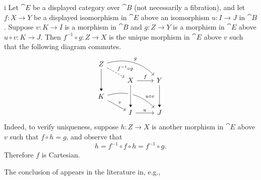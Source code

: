 \begin{partsolution}{i}
Let \(\cat{E}\) be a displayed category over \(\cat{B}\) (not necessarily a fibration), and let \(f : X \to Y\) be a displayed isomorphism in \(\cat{E}\) above an isomorphism \(u : I \to J\) in \(\cat{B}\).
Suppose \(v : K \to I\) is a morphism in \(\cat{B}\) and \(g : Z \to Y\) is a morphism in \(\cat{E}\) above \(u \circ v : K \to J\). Then \(f^{-1} \circ g : Z \to X\) is the unique morphism in \(\cat{E}\) above \(v\) such that the following diagram commutes.
\begin{equation*}
\begin{tikzcd}[row sep=small]
Z \arrow[rd, dashed, "f^{-1} \circ g"] \arrow[rrd, bend left, "g"] \arrow[dd, -Triangle] \\
& X \arrow[r, "f"] & Y \arrow[dd, -Triangle] \\
K \arrow[rd, "v"] \arrow[rrd, bend left, near end, "u \circ v"] \\
& I \arrow[r, "u"] & J
\arrow[from=uul, to=l, -Triangle, crossing over]
\end{tikzcd}
\end{equation*}
Indeed, to verify uniqueness, suppose \(h : Z \to X\) is another morphism in \(\cat{E}\) above \(v\) such that \(f \circ h = g\), and observe that
\begin{equation*}
h = f^{-1} \circ f \circ h = f^{-1} \circ g.
\end{equation*}
Therefore \(f\) is Cartesian.
\end{partsolution}

\begin{remark}
The conclusion of  appears in the literature in, e.g., \cite[Lemma~8.1.4(i)]{MR1313497}
\end{remark}

